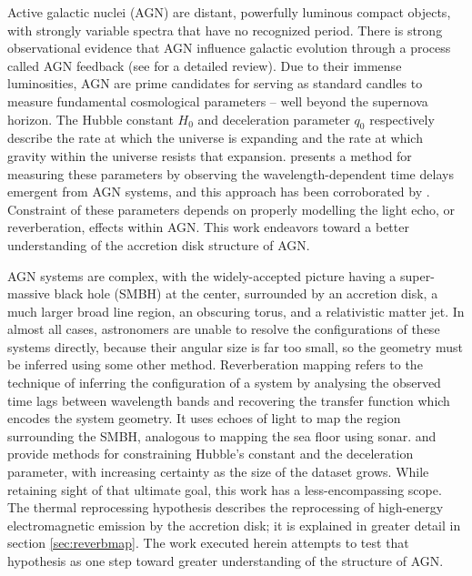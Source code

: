 \documentclass[11pt,letterpaper]{article}
\begin{document}
Active galactic nuclei (AGN) are distant, powerfully luminous compact objects, with strongly variable spectra that have no recognized period. There is strong observational evidence that AGN influence galactic evolution through a process called AGN feedback (see \cite{2012ARA&A..50..455F} for a detailed review). Due to their immense luminosities, AGN are prime candidates for serving as standard candles to measure fundamental cosmological parameters -- well beyond the supernova horizon. The Hubble constant $H_0$ and deceleration parameter $q_0$ respectively describe the rate at which the universe is expanding and the rate at which gravity within the universe resists that expansion. \cite{1999MNRAS.302L..24C} presents a method for measuring these parameters by observing the wavelength-dependent time delays emergent from AGN systems, and this approach has been corroborated by \cite{2007MNRAS.380..669C}. Constraint of these parameters depends on properly modelling the light echo, or reverberation, effects within AGN. This work endeavors toward a better understanding of the accretion disk structure of AGN.

AGN systems are complex, with the widely-accepted picture having a super-massive black hole (SMBH) at the center, surrounded by an accretion disk, a much larger broad line region, an obscuring torus, and a relativistic matter jet. In almost all cases, astronomers are unable to resolve the configurations of these systems directly, because their angular size is far too small, so the geometry must be inferred using some other method. Reverberation mapping refers to the technique of inferring the configuration of a system by analysing the observed time lags between wavelength bands and recovering the transfer function which encodes the system geometry. It uses echoes of light to map the region surrounding the SMBH, analogous to mapping the sea floor using sonar. \cite{1999MNRAS.302L..24C} and \cite{2007MNRAS.380..669C} provide methods for constraining Hubble's constant and the deceleration parameter, with increasing certainty as the size of the dataset grows. While retaining sight of that ultimate goal, this work has a less-encompassing scope. The thermal reprocessing hypothesis describes the reprocessing of high-energy electromagnetic emission by the accretion disk; it is explained in greater detail in section \ref{sec:reverbmap}. The work executed herein attempts to test that hypothesis as one step toward greater understanding of the structure of AGN.  
\end{document}
